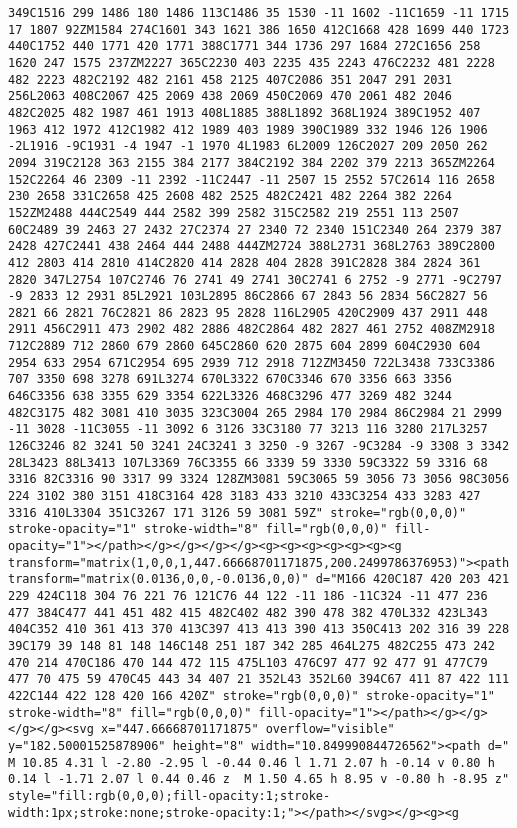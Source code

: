 \documentclass[
]{article}
\begin{document}
\begin{verbatim}
349C1516 299 1486 180 1486 113C1486 35 1530 -11 1602 -11C1659 -11 1715 17 1807 92ZM1584 274C1601 343 1621 386 1650 412C1668 428 1699 440 1723 440C1752 440 1771 420 1771 388C1771 344 1736 297 1684 272C1656 258 1620 247 1575 237ZM2227 365C2230 403 2235 435 2243 476C2232 481 2228 482 2223 482C2192 482 2161 458 2125 407C2086 351 2047 291 2031 256L2063 408C2067 425 2069 438 2069 450C2069 470 2061 482 2046 482C2025 482 1987 461 1913 408L1885 388L1892 368L1924 389C1952 407 1963 412 1972 412C1982 412 1989 403 1989 390C1989 332 1946 126 1906 -2L1916 -9C1931 -4 1947 -1 1970 4L1983 6L2009 126C2027 209 2050 262 2094 319C2128 363 2155 384 2177 384C2192 384 2202 379 2213 365ZM2264 152C2264 46 2309 -11 2392 -11C2447 -11 2507 15 2552 57C2614 116 2658 230 2658 331C2658 425 2608 482 2525 482C2421 482 2264 382 2264 152ZM2488 444C2549 444 2582 399 2582 315C2582 219 2551 113 2507 60C2489 39 2463 27 2432 27C2374 27 2340 72 2340 151C2340 264 2379 387 2428 427C2441 438 2464 444 2488 444ZM2724 388L2731 368L2763 389C2800 412 2803 414 2810 414C2820 414 2828 404 2828 391C2828 384 2824 361 2820 347L2754 107C2746 76 2741 49 2741 30C2741 6 2752 -9 2771 -9C2797 -9 2833 12 2931 85L2921 103L2895 86C2866 67 2843 56 2834 56C2827 56 2821 66 2821 76C2821 86 2823 95 2828 116L2905 420C2909 437 2911 448 2911 456C2911 473 2902 482 2886 482C2864 482 2827 461 2752 408ZM2918 712C2889 712 2860 679 2860 645C2860 620 2875 604 2899 604C2930 604 2954 633 2954 671C2954 695 2939 712 2918 712ZM3450 722L3438 733C3386 707 3350 698 3278 691L3274 670L3322 670C3346 670 3356 663 3356 646C3356 638 3355 629 3354 622L3326 468C3296 477 3269 482 3244 482C3175 482 3081 410 3035 323C3004 265 2984 170 2984 86C2984 21 2999 -11 3028 -11C3055 -11 3092 6 3126 33C3180 77 3213 116 3280 217L3257 126C3246 82 3241 50 3241 24C3241 3 3250 -9 3267 -9C3284 -9 3308 3 3342 28L3423 88L3413 107L3369 76C3355 66 3339 59 3330 59C3322 59 3316 68 3316 82C3316 90 3317 99 3324 128ZM3081 59C3065 59 3056 73 3056 98C3056 224 3102 380 3151 418C3164 428 3183 433 3210 433C3254 433 3283 427 3316 410L3304 351C3267 171 3126 59 3081 59Z" stroke="rgb(0,0,0)" stroke-opacity="1" stroke-width="8" fill="rgb(0,0,0)" fill-opacity="1"></path></g></g></g></g><g><g><g><g><g><g><g transform="matrix(1,0,0,1,447.66668701171875,200.2499786376953)"><path transform="matrix(0.0136,0,0,-0.0136,0,0)" d="M166 420C187 420 203 421 229 424C118 304 76 221 76 121C76 44 122 -11 186 -11C324 -11 477 236 477 384C477 441 451 482 415 482C402 482 390 478 382 470L332 423L343 404C352 410 361 413 370 413C397 413 413 390 413 350C413 202 316 39 228 39C179 39 148 81 148 146C148 251 187 342 285 464L275 482C255 473 242 470 214 470C186 470 144 472 115 475L103 476C97 477 92 477 91 477C79 477 70 475 59 470C45 443 34 407 21 352L43 352L60 394C67 411 87 422 111 422C144 422 128 420 166 420Z" stroke="rgb(0,0,0)" stroke-opacity="1" stroke-width="8" fill="rgb(0,0,0)" fill-opacity="1"></path></g></g></g></g><svg x="447.66668701171875" overflow="visible" y="182.50001525878906" height="8" width="10.849990844726562"><path d=" M 10.85 4.31 l -2.80 -2.95 l -0.44 0.46 l 1.71 2.07 h -0.14 v 0.80 h 0.14 l -1.71 2.07 l 0.44 0.46 z  M 1.50 4.65 h 8.95 v -0.80 h -8.95 z" style="fill:rgb(0,0,0);fill-opacity:1;stroke-width:1px;stroke:none;stroke-opacity:1;"></path></svg></g><g><g 
\end{verbatim}
\end{document}
